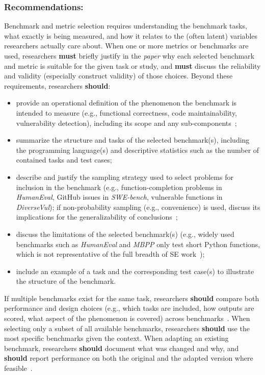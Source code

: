 \documentclass[smallextended]{svjour3}
\newcommand{\must}{\textbf{must}\xspace}
\newcommand{\should}{\textbf{should}\xspace}
\newcommand{\paper}{\emph{paper}\xspace}
\newcommand{\paper}{\emph{paper}\xspace}
\newcommand{\guidelinesubsubsection}[1]{\subsubsection{\bfseries #1:}}
\newcommand{\guidelinesubsubsection}[1]{\subsubsection{#1}}
\begin{document}
\guidelinesubsubsection{Recommendations}

Benchmark and metric selection requires understanding the benchmark tasks, what exactly is being measured, and how it relates to the (often latent) variables researchers actually care about. When one or more metrics or benchmarks are used, researchers \must briefly justify in the \paper why each selected benchmark and metric is suitable for the given task or study, and \must discuss the reliability and validity (especially construct validity) of those choices. Beyond these requirements, researchers \should:
\begin{itemize}
    \item provide an operational definition of the phenomenon the benchmark is intended to measure (e.g., functional correctness, code maintainability, vulnerability detection), including its scope and any sub-components~\cite{bean2025measuring};
    \item summarize the structure and tasks of the selected benchmark(s), including the programming language(s) and descriptive statistics such as the number of contained tasks and test cases;
    \item describe and justify the sampling strategy used to select problems for inclusion in the benchmark (e.g., function-completion problems in \emph{HumanEval}, GitHub issues in \emph{SWE-bench}, vulnerable functions in \emph{DiverseVul}); if non-probability sampling (e.g., convenience) is used, discuss its implications for the generalizability of conclusions~\cite{DBLP:journals/ese/BaltesR22, bean2025measuring};
    \item discuss the limitations of the selected benchmark(s) (e.g., widely used benchmarks such as \emph{HumanEval} \cite{DBLP:journals/corr/abs-2107-03374} and \emph{MBPP} \cite{DBLP:journals/corr/abs-2108-07732} only test short Python functions, which is not representative of the full breadth of SE work~\cite{Chandra2025benchmarks});
    \item include an example of a task and the corresponding test case(s) to illustrate the structure of the benchmark.
\end{itemize}

If multiple benchmarks exist for the same task, researchers \should compare both performance and design choices (e.g., which tasks are included, how outputs are scored, what aspect of the phenomenon is covered) across benchmarks~\cite{bean2025measuring}.
When selecting only a subset of all available benchmarks, researchers \should use the most specific benchmarks given the context.
When adapting an existing benchmark, researchers \should document what was changed and why, and \should report performance on both the original and the adapted version where feasible~\cite{bean2025measuring}.
\end{document}
